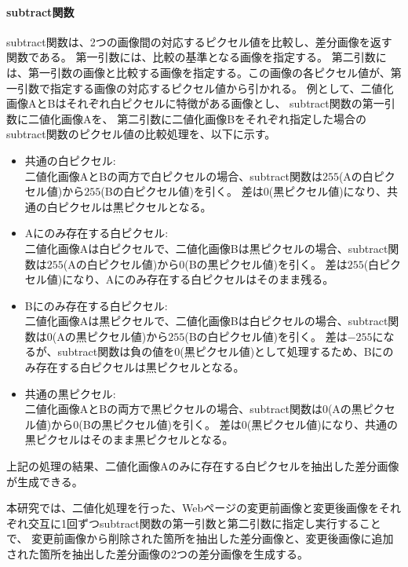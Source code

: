 \paragraph{subtract関数}
subtract関数は、2つの画像間の対応するピクセル値を比較し、差分画像を返す関数である。
第一引数には、比較の基準となる画像を指定する。
第二引数には、第一引数の画像と比較する画像を指定する。この画像の各ピクセル値が、第一引数で指定する画像の対応するピクセル値から引かれる。
例として、二値化画像AとBはそれぞれ白ピクセルに特徴がある画像とし、
subtract関数の第一引数に二値化画像Aを、
第二引数に二値化画像Bをそれぞれ指定した場合のsubtract関数のピクセル値の比較処理を、以下に示す。
\par
\begin{itemize}
      \setlength{\itemsep}{0pt}
            \setlength{\parsep}{0pt}
      \item 共通の白ピクセル:\\
            二値化画像AとBの両方で白ピクセルの場合、subtract関数は$255$(Aの白ピクセル値)から$255$(Bの白ピクセル値)を引く。
            差は$0$(黒ピクセル値)になり、共通の白ピクセルは黒ピクセルとなる。
      \item Aにのみ存在する白ピクセル:\\
            二値化画像Aは白ピクセルで、二値化画像Bは黒ピクセルの場合、subtract関数は$255$(Aの白ピクセル値)から$0$(Bの黒ピクセル値)を引く。
            差は$255$(白ピクセル値)になり、Aにのみ存在する白ピクセルはそのまま残る。
      \item Bにのみ存在する白ピクセル:\\
            二値化画像Aは黒ピクセルで、二値化画像Bは白ピクセルの場合、subtract関数は$0$(Aの黒ピクセル値)から$255$(Bの白ピクセル値)を引く。
            差は$-255$になるが、subtract関数は負の値を$0$(黒ピクセル値)として処理するため、Bにのみ存在する白ピクセルは黒ピクセルとなる。
      \item 共通の黒ピクセル:\\
            二値化画像AとBの両方で黒ピクセルの場合、subtract関数は$0$(Aの黒ピクセル値)から$0$(Bの黒ピクセル値)を引く。
            差は$0$(黒ピクセル値)になり、共通の黒ピクセルはそのまま黒ピクセルとなる。
\end{itemize}
上記の処理の結果、二値化画像Aのみに存在する白ピクセルを抽出した差分画像が生成できる。
\par
本研究では、二値化処理を行った、Webページの変更前画像と変更後画像をそれぞれ交互に1回ずつsubtract関数の第一引数と第二引数に指定し実行することで、
変更前画像から削除された箇所を抽出した差分画像と、変更後画像に追加された箇所を抽出した差分画像の2つの差分画像を生成する。
